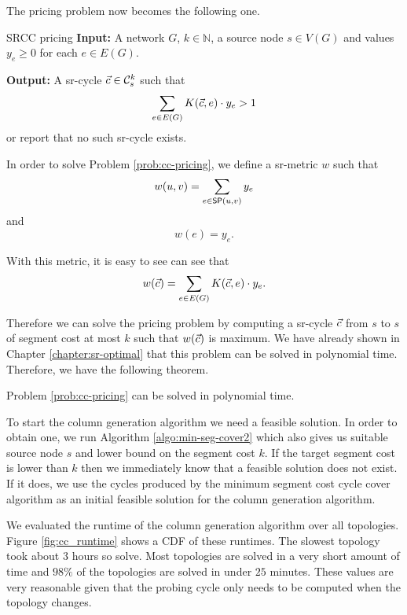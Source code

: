 The pricing problem now becomes the following one.

\begin{problem}{SRCC pricing}
\label{prob:cc-pricing}
\textbf{Input:} A network $G$, $k \in \mathbb{N}$, a source node $s \in V(G)$ and values $y_e \geq 0$ for each $e \in E(G)$.

\textbf{Output:} A sr-cycle $\sr{c} \in \mathcal{C}^k_s$ such that
$$
\sum_{e \in E(G)} K(\sr{c}, e) \cdot y_e > 1
$$
or report that no such sr-cycle exists.
\end{problem}

In order to solve Problem \ref{prob:cc-pricing}, we define a sr-metric $w$ such that 
$$
w(u, v) = \sum_{e \in \sp(u, v)} y_e
$$
and
$$
w(e) = y_e.
$$

With this metric, it is easy to see can see that
$$
w(\sr{c}) = \sum_{e \in E(G)} K(\sr{c}, e) \cdot y_e.
$$

Therefore we can solve the pricing problem by computing a sr-cycle $\sr{c}$ from $s$ to $s$ of segment
cost at most $k$ such that $w(\sr{c})$ is maximum. We have already shown in Chapter \ref{chapter:sr-optimal} that 
this problem can be solved in polynomial time. Therefore, we have the following theorem.

\begin{theorem}
Problem \ref{prob:cc-pricing} can be solved in polynomial time.
\end{theorem}

To start the column generation algorithm we need a feasible solution. In order to obtain one, we run Algorithm \ref{algo:min-seg-cover2} which also gives us
suitable source node $s$ and lower bound on the segment cost $k$. If the target segment cost is lower than $k$ then we immediately know
that a feasible solution does not exist. If it does, we use the cycles produced by the minimum segment cost cycle cover algorithm as an 
initial feasible solution for the column generation algorithm.

We evaluated the runtime of the column generation algorithm over all topologies. Figure \ref{fig:cc_runtime} shows a CDF of these runtimes.
The slowest topology took about $3$ hours so solve. Most topologies are solved in a very short amount of time and $98\%$ of the topologies
are solved in under $25$ minutes. These values are very reasonable given that the probing cycle only needs to be computed when the topology changes.

